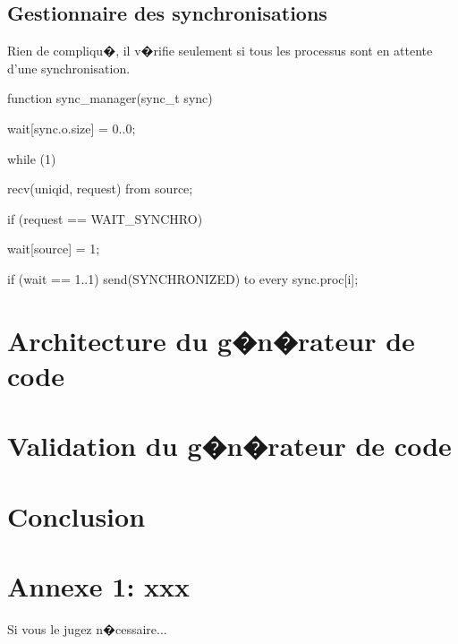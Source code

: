\documentclass[10pt,a4paper]{article}
\begin{document}
\subsection{Gestionnaire des synchronisations}

Rien de compliqu�, il v�rifie seulement si tous les processus sont
en attente d'une synchronisation.

\begin{codec}
function sync_manager(sync_t sync) {
  wait[sync.o.size] = {0..0};

  while (1) {
    recv(uniqid, request) from source;

    if (request == WAIT_SYNCHRO) {
      wait[source] = 1;

      if (wait == {1..1})
        send(SYNCHRONIZED) to every sync.proc[i];
    }
  }
}
\end{codec}


\section{Architecture du g�n�rateur de code}


\section{Validation du g�n�rateur de code}


\section{Conclusion}


\vfill
\eject
\section*{Annexe 1: xxx}
Si vous le jugez n�cessaire...
 
\end{document}
